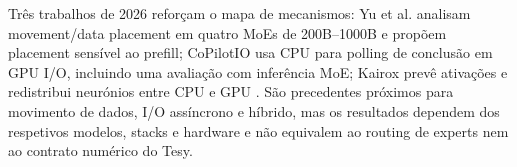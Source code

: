 Três trabalhos de 2026 reforçam o mapa de mecanismos: Yu et al. analisam movement/data placement em quatro MoEs de 200B--1000B e propõem placement sensível ao prefill; CoPilotIO usa CPU para polling de conclusão em GPU I/O, incluindo uma avaliação com inferência MoE; Kairox prevê ativações e redistribui neurónios entre CPU e GPU \cite{yu2026patterns,chen2026copilotio,jiang2026kairox}. São precedentes próximos para movimento de dados, I/O assíncrono e híbrido, mas os resultados dependem dos respetivos modelos, stacks e hardware e não equivalem ao routing de experts nem ao contrato numérico do Tesy.
